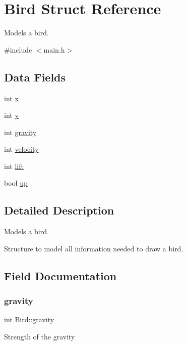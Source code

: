 \hypertarget{struct_bird}{}\section{Bird Struct Reference}
\label{struct_bird}


Models a bird.  




{\ttfamily \#include $<$main.\+h$>$}

\subsection*{Data Fields}
\begin{DoxyCompactItemize}
\item 
int \hyperlink{struct_bird_ae4657ec5b3f2a736b7a17951590e5bea}{x}
\item 
int \hyperlink{struct_bird_ae2ece10ede5691ff56faa76969a24b3a}{y}
\item 
int \hyperlink{struct_bird_ae74e3f2b5c04d4463f78044a50d97446}{gravity}
\item 
int \hyperlink{struct_bird_a202c41f509c3e64c4e7c1c122e76ce8e}{velocity}
\item 
int \hyperlink{struct_bird_a73893a29959e1a95d0b727c015fb8049}{lift}
\item 
bool \hyperlink{struct_bird_a7736a1da7f311ccc4caf83e031177a31}{up}
\end{DoxyCompactItemize}


\subsection{Detailed Description}
Models a bird. 

Structure to model all information needed to draw a bird. 

\subsection{Field Documentation}
\mbox{\label{struct_bird_ae74e3f2b5c04d4463f78044a50d97446}} 
\subsubsection{\texorpdfstring{gravity}{gravity}}
{\footnotesize\ttfamily int Bird\+::gravity}

Strength of the gravity \mbox{\label{struct_bird_a73893a29959e1a95d0b727c015fb8049}} 

